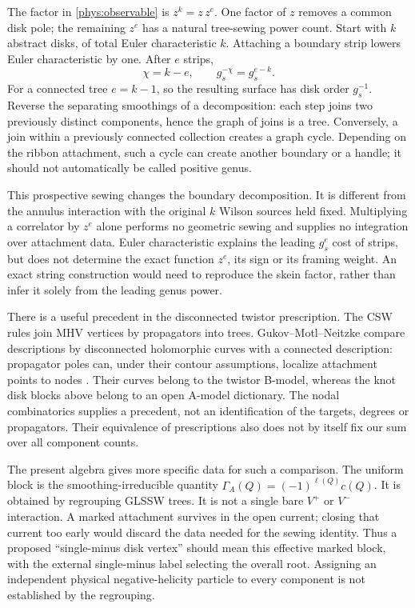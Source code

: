 \documentclass[11pt,letterpaper]{article}
\numberwithin{equation}{section}
\theoremstyle{definition}
\theoremstyle{remark}
\begin{document}
The factor in \eqref{phys:observable} is $z^{k}=z\,z^{e}$. One factor
of $z$ removes a common disk pole; the remaining $z^e$ has a natural
tree-sewing power count. Start with $k$ abstract disks, of total Euler
characteristic $k$. Attaching a boundary strip lowers Euler
characteristic by one. After $e$ strips,
\begin{equation}
 \chi=k-e,\qquad g_s^{-\chi}=g_s^{e-k}.
 \label{phys:strips}
\end{equation}
For a connected tree $e=k-1$, so the resulting surface has disk order
$g_s^{-1}$. Reverse the separating smoothings of a decomposition: each
step joins two previously distinct components, hence the graph of
joins is a tree. Conversely, a join within a previously connected
collection creates a graph cycle. Depending on the ribbon attachment,
such a cycle can create another boundary or a handle; it should not
automatically be called positive genus.

This prospective sewing changes the boundary decomposition. It is
different from the annulus interaction with the original $k$ Wilson
sources held fixed. Multiplying a correlator by $z^e$ alone performs no
geometric sewing and supplies no integration over attachment data.
Euler characteristic explains the leading $g_s^e$ cost of strips, but
does not determine the exact function $z^e$, its sign or its framing
weight. An exact string construction would need to reproduce the skein
factor, rather than infer it solely from the leading genus power.

There is a useful precedent in the disconnected twistor prescription.
The CSW rules join MHV vertices by propagators into trees.
Gukov--Motl--Neitzke compare descriptions by disconnected
holomorphic curves with a connected description: propagator poles can,
under their contour assumptions, localize attachment points to nodes
\cite[Secs.~2.2 and 4]{GMN}. Their curves belong to the twistor B-model,
whereas the knot disk blocks above belong to an open A-model dictionary.
The nodal combinatorics supplies a precedent, not an identification of
the targets, degrees or propagators. Their equivalence of prescriptions
also does not by itself fix our sum over all component counts.

The present algebra gives more specific data for such a comparison.
The uniform block is the smoothing-irreducible quantity
$\Gamma_A(Q)=(-1)^{\ell(Q)}c(Q)$. It is obtained by regrouping GLSSW
trees. It is not a single bare $V^+$ or $V^-$ interaction. A marked
attachment survives in the open current; closing that current too early
would discard the data needed for the sewing identity. Thus a proposed
``single-minus disk vertex'' should mean this effective marked block,
with the external single-minus label selecting the overall root.
Assigning an independent physical negative-helicity particle to every
component is not established by the regrouping.
\end{document}
